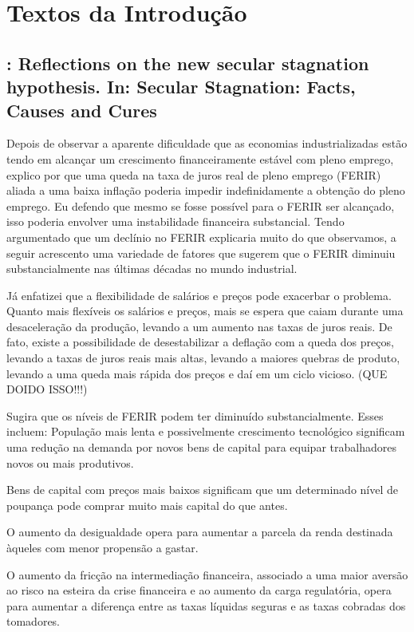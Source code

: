 \chapter{Textos da Introdução}
%
%
\section{\citet{Summers:2014}: Reflections on the new secular stagnation hypothesis. In: Secular Stagnation: Facts, Causes and Cures} 

Depois de observar a aparente dificuldade que as economias industrializadas estão tendo em alcançar um crescimento financeiramente estável com pleno emprego, explico por que uma queda na taxa de juros real de pleno emprego (FERIR) aliada a uma baixa inflação poderia impedir indefinidamente a obtenção do pleno emprego. Eu defendo que mesmo se fosse possível para o FERIR ser alcançado, isso poderia envolver uma instabilidade financeira substancial. Tendo argumentado que um declínio no FERIR explicaria muito do que observamos, a seguir acrescento uma variedade de fatores que sugerem que o FERIR diminuiu substancialmente nas últimas décadas no mundo industrial.

Já enfatizei que a flexibilidade de salários e preços pode exacerbar o problema. Quanto mais flexíveis os salários e preços, mais se espera que caiam durante uma desaceleração da produção, levando a um aumento nas taxas de juros reais. De fato, existe a possibilidade de desestabilizar a deflação com a queda dos preços, levando a taxas de juros reais mais altas, levando a maiores quebras de produto, levando a uma queda mais rápida dos preços e daí em um ciclo vicioso. (QUE DOIDO ISSO!!!)

Sugira que os níveis de FERIR podem ter diminuído substancialmente. Esses incluem:
População mais lenta e possivelmente crescimento tecnológico significam uma redução na demanda por novos bens de capital para equipar trabalhadores novos ou mais produtivos.

Bens de capital com preços mais baixos significam que um determinado nível de poupança pode comprar muito mais capital do que antes.

O aumento da desigualdade opera para aumentar a parcela da renda destinada àqueles com menor propensão a gastar.

O aumento da fricção na intermediação financeira, associado a uma maior aversão ao risco na esteira da crise financeira e ao aumento da carga regulatória, opera para aumentar a diferença entre as taxas líquidas seguras e as taxas cobradas dos tomadores.

